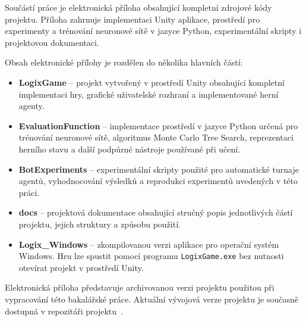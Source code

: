 \documentclass[12pt,a4paper]{report}
\begin{document}
Součástí práce je elektronická příloha obsahující kompletní zdrojové kódy projektu. 
Příloha zahrnuje implementaci Unity aplikace, prostředí pro experimenty a trénování 
neuronové sítě v jazyce Python, experimentální skripty i projektovou dokumentaci.

Obsah elektronické přílohy je rozdělen do několika hlavních částí:

\begin{itemize}
    \item \textbf{LogixGame} – projekt vytvořený v prostředí Unity obsahující kompletní implementaci hry, grafické uživatelské rozhraní a implementované herní agenty.
    
    \item \textbf{EvaluationFunction} – implementace prostředí v jazyce Python určená pro trénování neuronové sítě, algoritmus Monte Carlo Tree Search, reprezentaci herního stavu a další podpůrné nástroje používané při učení.

    \item \textbf{BotExperiments} – experimentální skripty použité pro automatické turnaje agentů, vyhodnocování výsledků a reprodukci experimentů uvedených v této práci.

    \item \textbf{docs} – projektová dokumentace obsahující stručný popis jednotlivých částí projektu, jejich struktury a způsobu použití.

    \item \textbf{Logix\_Windows} – zkompilovanou verzi aplikace pro operační systém Windows. Hru lze spustit pomocí programu \texttt{LogixGame.exe} bez nutnosti otevírat projekt v prostředí Unity.
\end{itemize}

Elektronická příloha představuje archivovanou verzi projektu použitou při vypracování této bakalářské práce. Aktuální vývojová verze projektu je současně dostupná v repozitáři projektu~\cite{logix_gitlab}.
\end{document}
